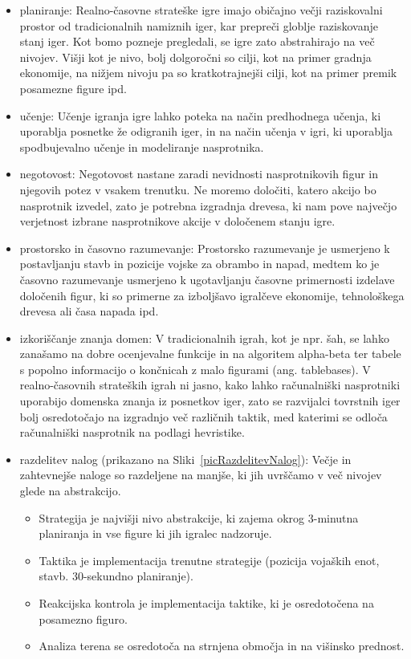 \documentclass[a4paper, 12pt]{book}
\begin{document}
\begin{itemize}
	\item planiranje: Realno-časovne strateške igre imajo običajno večji raziskovalni prostor od tradicionalnih namiznih iger, kar prepreči globlje raziskovanje stanj iger. 
	Kot bomo pozneje pregledali, se igre zato abstrahirajo na več nivojev.
	Višji kot je nivo, bolj dolgoročni so cilji, kot na primer gradnja ekonomije, na nižjem nivoju pa so kratkotrajnejši cilji, kot na primer premik posamezne figure ipd.
	\item učenje: Učenje igranja igre lahko poteka na način predhodnega učenja, ki uporablja posnetke že odigranih iger, in na način učenja v igri, ki uporablja spodbujevalno učenje in modeliranje nasprotnika.
	\item negotovost: Negotovost nastane zaradi nevidnosti nasprotnikovih figur in njegovih potez v vsakem trenutku. 
	Ne moremo določiti, katero akcijo bo nasprotnik izvedel, zato je potrebna izgradnja drevesa, ki nam pove največjo verjetnost izbrane nasprotnikove akcije v določenem stanju igre.
	\item prostorsko in časovno razumevanje: Prostorsko razumevanje je usmerjeno k postavljanju stavb in pozicije vojske za obrambo in napad, medtem ko je časovno razumevanje usmerjeno k ugotavljanju časovne primernosti izdelave določenih figur, ki so primerne za izboljšavo igralčeve ekonomije, tehnološkega drevesa ali časa napada ipd.
	\item izkoriščanje znanja domen: V tradicionalnih igrah, kot je npr. šah, se lahko zanašamo na dobre ocenjevalne funkcije in na algoritem alpha-beta ter tabele s popolno informacijo o končnicah z malo figurami (ang. tablebases).
	V realno-časovnih strateških igrah ni jasno, kako lahko računalniški nasprotniki uporabijo domenska znanja iz posnetkov iger, zato se razvijalci tovrstnih iger bolj osredotočajo na izgradnjo več različnih taktik, med katerimi se odloča računalniški nasprotnik na podlagi hevristike.
	\item razdelitev nalog (prikazano na Sliki~\ref{picRazdelitevNalog}): Večje in zahtevnejše naloge so razdeljene na manjše, ki jih uvrščamo v več nivojev glede na abstrakcijo.
	\begin{itemize}
		\item Strategija je najvišji nivo abstrakcije, ki zajema okrog 3-minutna planiranja in vse figure ki jih igralec nadzoruje.
		\item Taktika je implementacija trenutne strategije (pozicija vojaških enot, stavb. 30-sekundno planiranje).
		\item Reakcijska kontrola je implementacija taktike, ki je osredotočena na posamezno figuro.
		\item Analiza terena se osredotoča na strnjena območja in na višinsko prednost.
	\end{itemize}


\end{itemize}
\end{document}
